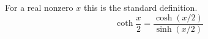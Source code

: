 \documentclass{article}
\begin{document}
For a real nonzero $x$ this is the standard definition.
\begin{equation}
  \coth\frac{x}{2}=\frac{\cosh(x/2)}{\sinh(x/2)}
\end{equation}
\end{document}
